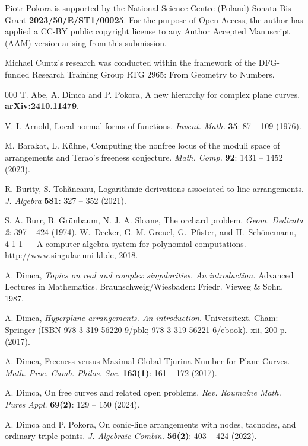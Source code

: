 \documentclass[12pt]{article}
\theoremstyle{plain}
\theoremstyle{definition}
\begin{document}
Piotr Pokora is supported by the National Science Centre (Poland) Sonata Bis Grant \textbf{2023/50/E/ST1/00025}. For the purpose of Open Access, the author has applied a CC-BY public copyright license to any Author Accepted Manuscript (AAM) version arising from this submission.

Michael Cuntz's research was conducted within the framework of the DFG-funded Research Training Group RTG 2965: From Geometry to Numbers.

\begin{thebibliography}{000}
T. Abe, A. Dimca and P. Pokora, A new hierarchy for complex plane curves. \textbf{arXiv:2410.11479}.

V. I. Arnold, Local normal forms of functions. \textit{Invent. Math.} \textbf{35}: 87 -- 109 (1976).

M. Barakat, L. K\"uhne, Computing the nonfree locus of the moduli space of arrangements and Terao's freeness conjecture.  \textit{Math. Comp.} \textbf{92}: 1431 -- 1452 (2023).

 R. Burity, S. Toh\u aneanu, Logarithmic derivations associated to line arrangements. \textit{J. Algebra} \textbf{581}: 327 -- 352 (2021).

S. A. Burr, B. Gr\"unbaum, N. J. A. Sloane,
The orchard problem. \textit{Geom. Dedicata} \textit{2}: 397 -- 424 (1974).
W.~Decker, G.-M. Greuel, G.~Pfister, and H.~Sch\"onemann,
 {4-1-1} --- {A} computer algebra system for polynomial computations. \newblock \url{http://www.singular.uni-kl.de}, 2018.

A. Dimca,  \textit{Topics on real and complex singularities. An introduction.} Advanced Lectures in Mathematics. Braunschweig/Wiesbaden: Friedr. Vieweg \& Sohn. 1987.

A. Dimca,  \textit{Hyperplane arrangements. An introduction}. Universitext. Cham: Springer (ISBN 978-3-319-56220-9/pbk; 978-3-319-56221-6/ebook). xii, 200 p. (2017).

A. Dimca, Freeness versus Maximal Global Tjurina Number for Plane Curves. \textit{Math. Proc. Camb. Philos. Soc.} \textbf{163(1)}: 161 -- 172 (2017).

A. Dimca, On free curves and related open problems. \textit{Rev. Roumaine Math. Pures Appl.} \textbf{69(2)}: 129 -- 150 (2024).

A. Dimca and P. Pokora, On conic-line arrangements with nodes, tacnodes, and ordinary triple points. \textit{J. Algebraic Combin.} \textbf{56(2)}: 403 -- 424 (2022).



\end{thebibliography}
\end{document}
